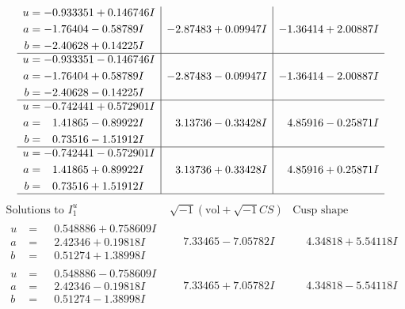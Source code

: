 \documentclass[1p]{elsarticle_modified}
\theoremstyle{definition}
\newcommand{\I}{\sqrt{-1}}
\begin{document}
$$\begin{array}{c|c|c}
\begin{aligned}
u &= -0.933351 + 0.146746 I \\
a &= -1.76404 - 0.58789 I \\
b &= -2.40628 + 0.14225 I\end{aligned}
 & -2.87483 + 0.09947 I & -1.36414 + 2.00887 I \\ \hline\begin{aligned}
u &= -0.933351 - 0.146746 I \\
a &= -1.76404 + 0.58789 I \\
b &= -2.40628 - 0.14225 I\end{aligned}
 & -2.87483 - 0.09947 I & -1.36414 - 2.00887 I \\ \hline\begin{aligned}
u &= -0.742441 + 0.572901 I \\
a &= \phantom{-}1.41865 - 0.89922 I \\
b &= \phantom{-}0.73516 - 1.51912 I\end{aligned}
 & \phantom{-}3.13736 - 0.33428 I & \phantom{-}4.85916 - 0.25871 I \\ \hline\begin{aligned}
u &= -0.742441 - 0.572901 I \\
a &= \phantom{-}1.41865 + 0.89922 I \\
b &= \phantom{-}0.73516 + 1.51912 I\end{aligned}
 & \phantom{-}3.13736 + 0.33428 I & \phantom{-}4.85916 + 0.25871 I\\
 \hline 
 \end{array}$$\newpage$$\begin{array}{c|c|c}  
\text{Solutions to }I^u_{1}& \I (\text{vol} + \sqrt{-1}CS) & \text{Cusp shape}\\
 \hline 
\begin{aligned}
u &= \phantom{-}0.548886 + 0.758609 I \\
a &= \phantom{-}2.42346 + 0.19818 I \\
b &= \phantom{-}0.51274 + 1.38998 I\end{aligned}
 & \phantom{-}7.33465 - 7.05782 I & \phantom{-}4.34818 + 5.54118 I \\ \hline\begin{aligned}
u &= \phantom{-}0.548886 - 0.758609 I \\
a &= \phantom{-}2.42346 - 0.19818 I \\
b &= \phantom{-}0.51274 - 1.38998 I\end{aligned}
 & \phantom{-}7.33465 + 7.05782 I & \phantom{-}4.34818 - 5.54118 I \\ \hline\begin{aligned}

\end{aligned}
\end{array}$$
\end{document}
